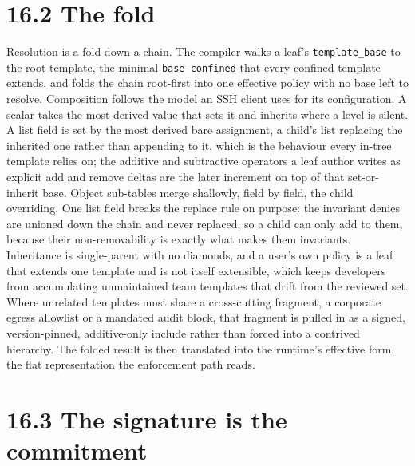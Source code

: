 \hypertarget{the-fold}{%
\section{16.2 The fold}\label{the-fold}}

Resolution is a fold down a chain. The compiler walks a leaf's
\texttt{template\_base} to the root template, the minimal
\texttt{base-confined} that every confined template extends, and folds
the chain root-first into one effective policy with no base left to
resolve. Composition follows the model an SSH client uses for its
configuration. A scalar takes the most-derived value that sets it and
inherits where a level is silent. A list field is set by the most
derived bare assignment, a child's list replacing the inherited one
rather than appending to it, which is the behaviour every in-tree
template relies on; the additive and subtractive operators a leaf author
writes as explicit add and remove deltas are the later increment on top
of that set-or-inherit base. Object sub-tables merge shallowly, field by
field, the child overriding. One list field breaks the replace rule on
purpose: the invariant denies are unioned down the chain and never
replaced, so a child can only add to them, because their
non-removability is exactly what makes them invariants. Inheritance is
single-parent with no diamonds, and a user's own policy is a leaf that
extends one template and is not itself extensible, which keeps
developers from accumulating unmaintained team templates that drift from
the reviewed set. Where unrelated templates must share a cross-cutting
fragment, a corporate egress allowlist or a mandated audit block, that
fragment is pulled in as a signed, version-pinned, additive-only include
rather than forced into a contrived hierarchy. The folded result is then
translated into the runtime's effective form, the flat representation
the enforcement path reads.

\hypertarget{the-signature-is-the-commitment}{%
\section{16.3 The signature is the
commitment}\label{the-signature-is-the-commitment}}

